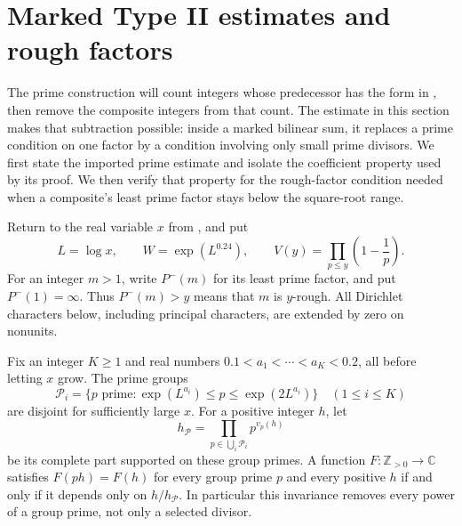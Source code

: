 \section{Marked Type II estimates and rough factors}
\label{sec:type-ii}

The prime construction will count integers whose predecessor has the form
in , then remove the composite integers
from that count.  The estimate in this section makes that subtraction
possible: inside a marked bilinear sum, it replaces a prime condition on
one factor by a condition involving only small prime divisors.  We first
state the imported prime estimate and isolate the coefficient property
used by its proof.  We then verify that property for the rough-factor
condition needed when a composite's least prime factor stays below
the square-root range.

Return to the real variable \(x\) from , and put
\begin{equation}\label{eq:sieve-basic-parameters}
 L=\log x,\qquad W=\exp(L^{0.24}),\qquad
 V(y)=\prod_{p\le y}\left(1-\frac1p\right).
\end{equation}
For an integer \(m>1\), write \(P^-(m)\) for its least prime factor, and
put \(P^-(1)=\infty\).  Thus \(P^-(m)>y\) means that \(m\) is
\(y\)-rough.  All Dirichlet characters below, including principal
characters, are extended by zero on nonunits.

Fix an integer \(K\ge1\) and real numbers
\(0.1<a_1<\cdots<a_K<0.2\), all before letting \(x\) grow.  The prime
groups
\begin{equation}\label{eq:marked-prime-groups}
 \mathcal P_i=\{p\text{ prime}:\exp(L^{a_i})\le p\le\exp(2L^{a_i})\}
 \quad (1\le i\le K)
\end{equation}
are disjoint for sufficiently large \(x\).  For a positive integer
\(h\), let
\begin{equation}\label{eq:complete-band-part}
 h_{\mathcal P}=\prod_{p\in\bigcup_i\mathcal P_i}p^{v_p(h)}
\end{equation}
be its complete part supported on these group primes.  A function
\(F:\mathbb Z_{>0}\to\mathbb C\) satisfies \(F(ph)=F(h)\) for every
group prime \(p\) and every positive
\(h\) if and only if it depends only on \(h/h_{\mathcal P}\).  In
particular this invariance removes every power of a group prime, not
only a selected divisor.

